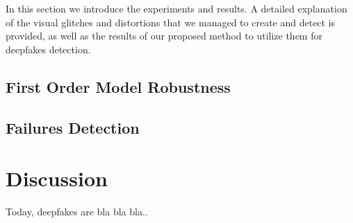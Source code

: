 \documentclass[english,12pt]{article}
\begin{document}
In this section we introduce the experiments and results. A detailed explanation of the
visual glitches and distortions that we managed to create and detect is provided, as well
as the results of our proposed method to utilize them for deepfakes detection.

\subsection{First Order Model Robustness}

\subsection{Failures Detection}



\section{Discussion} \label{discussion}

Today, deepfakes are bla bla bla..

\pagebreak{}




\end{document}
